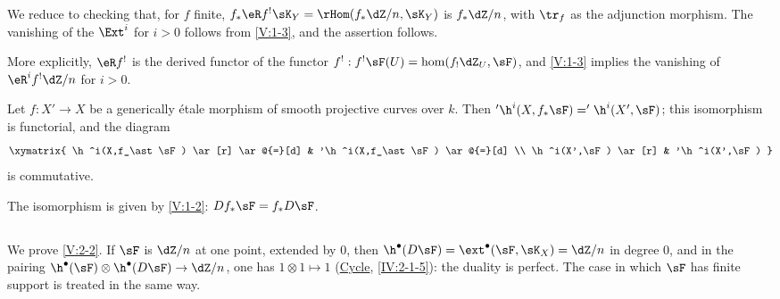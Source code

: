 \documentclass[oneside]{book}
\begin{document}
We reduce to checking that, for $f$ finite,
$f_\ast \eR f^!\sK_Y = \rHom(f_\ast\dZ/n,\sK_Y)$ is $f_\ast\dZ/n$, with
$\tr_f$ as the adjunction morphism. The vanishing of the $\Ext^i$ for $i>0$
follows from \ref{V:1-3}, and the assertion follows.

More explicitly, $\eR f^!$ is the derived functor of the functor
$f^!:f^!\sF(U)=\hom(f_!\dZ_U,\sF)$, and \ref{V:1-3} implies the vanishing of
$\eR^i f^!\dZ/n$ for $i>0$.


\begin{corollary_}\label{V:2-4}
Let $f:X'\to X$ be a generically étale morphism of smooth projective curves
over $k$. Then $'\h^i(X,f_\ast \sF)='\h^i(X',\sF)$; this isomorphism is
functorial, and the diagram
\[\xymatrix{
  \h^i(X,f_\ast\sF) \ar[r] \ar@{=}[d]
    & '\h^i(X,f_\ast\sF) \ar@{=}[d] \\
  \h^i(X',\sF) \ar[r]
    & '\h^i(X',\sF)
}\]
is commutative.
\end{corollary_}

The isomorphism is given by \ref{V:1-2}: $D f_\ast\sF=f_\ast D\sF$.


\subsection{}\label{V:2-5}

We prove \ref{V:2-2}. If $\sF$ is $\dZ/n$ at one point, extended by $0$,
then $\h^\bullet(D\sF) = \ext^\bullet(\sF,\sK_X)=\dZ/n$ in degree $0$, and
in the pairing $\h^\bullet(\sF)\otimes\h^\bullet(D\sF) \to \dZ/n$, one has
$1\otimes 1\mapsto 1$ (\hyperref[IV]{Cycle}, \ref{IV:2-1-5}): the duality is
perfect. The case in which $\sF$ has finite support is treated in the same
way.
\end{document}
